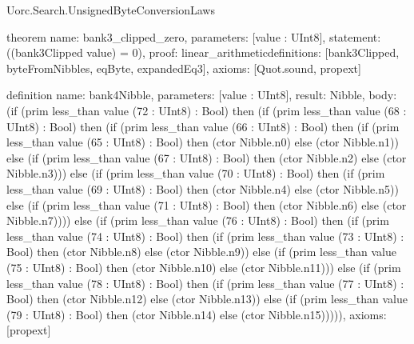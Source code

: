 \begin{lexlean}{Uorc.Search.UnsignedByteConversionLaws}
\begin{semanticmodule}
theorem{
  name: bank3_clipped_zero,
  parameters: [value : UInt8],
  statement: ((bank3Clipped value) = 0),
  proof: linear_arithmetic{definitions: [bank3Clipped, byteFromNibbles, eqByte, expandedEq3]},
  axioms: [Quot.sound, propext]
}

definition{
  name: bank4Nibble,
  parameters: [value : UInt8],
  result: Nibble,
  body: (if (prim less_than value (72 : UInt8) : Bool) then (if (prim less_than value (68 : UInt8) : Bool) then (if (prim less_than value (66 : UInt8) : Bool) then (if (prim less_than value (65 : UInt8) : Bool) then (ctor Nibble.n0) else (ctor Nibble.n1)) else (if (prim less_than value (67 : UInt8) : Bool) then (ctor Nibble.n2) else (ctor Nibble.n3))) else (if (prim less_than value (70 : UInt8) : Bool) then (if (prim less_than value (69 : UInt8) : Bool) then (ctor Nibble.n4) else (ctor Nibble.n5)) else (if (prim less_than value (71 : UInt8) : Bool) then (ctor Nibble.n6) else (ctor Nibble.n7)))) else (if (prim less_than value (76 : UInt8) : Bool) then (if (prim less_than value (74 : UInt8) : Bool) then (if (prim less_than value (73 : UInt8) : Bool) then (ctor Nibble.n8) else (ctor Nibble.n9)) else (if (prim less_than value (75 : UInt8) : Bool) then (ctor Nibble.n10) else (ctor Nibble.n11))) else (if (prim less_than value (78 : UInt8) : Bool) then (if (prim less_than value (77 : UInt8) : Bool) then (ctor Nibble.n12) else (ctor Nibble.n13)) else (if (prim less_than value (79 : UInt8) : Bool) then (ctor Nibble.n14) else (ctor Nibble.n15))))),
  axioms: [propext]
}


\end{semanticmodule}
\end{lexlean}
